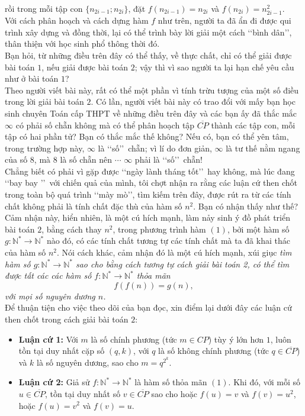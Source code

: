 rồi trong mỗi tập con $\{n_{2i-1};n_{2i}\}$, đặt $f(n_{2i-1})=n_{2i}$ và $f(n_{2i})=n_{2i-1}^2$.\\
Với cách phân hoạch và cách dựng hàm $f$ như trên, người ta đã ẩn đi được qui trình xây dựng và đồng thời, lại có thể trình bày lời giải một cách \lq\lq bình dân\rq\rq, thân thiện với học sinh phổ thông thời đó.\\
Bạn hỏi, từ những điều trên đây có thể thấy, về thực chất, chỉ có thể giải được bài toán $1$, nếu giải được bài toán $2$; vậy thì vì sao người ta lại hạn chế yêu cầu như ở bài toán $1$?\\
Theo người viết bài này, rất có thể một phần vì tính trừu tượng của một số điều trong lời giải bài toán $2$. Có lần, người viết bài này có trao đổi với mấy bạn học sinh chuyên Toán cấp THPT về những điều trên đây và các bạn ấy đã thắc mắc $\infty$ có phải số chẵn không mà có thể phân hoạch tập $\overline{CP}$ thành các tập con, mỗi tập có hai phần tử? Bạn có thắc mắc thế không? Nếu có, bạn có thể yên tâm, trong trường hợp này, $\infty$ là \lq\lq số\rq\rq\, chẵn; vì lí do đơn giản, $\infty$ là tư thế nằm ngang của số $8$, mà $8$ là số chẵn nên $\cdots$ $\infty$ phải là \lq\lq số\rq\rq\, chẵn!\\
Chẳng biết có phải vì gặp được \lq\lq ngày lành tháng tốt\rq\rq\,  hay không, mà lúc đang \lq\lq bay bay \rq\rq\, với chiến quả của mình, tôi chợt nhận ra rằng các luận cứ then chốt trong toàn bộ quá trình \lq\lq mày mò\rq\rq, tìm kiếm trên đây, được rút ra từ các tính chất không phải là tính chất đặc thù của hàm số $n^2$. Bạn có nhận thấy như thế? Cảm nhận này, hiển nhiên, là một cú hích mạnh, làm nảy sinh ý đồ phát triển bài toán $2$, bằng cách thay $n^2$, trong phương trình hàm $(1)$, bởi một hàm số $g:\mathbb{N}^*\rightarrow\mathbb{N}^*$ nào đó, có các tính chất tương tự các tính chất mà ta đã khai thác của hàm số $n^2$. Nói cách khác, cảm nhận đó là một cú hích mạnh, xúi giục \textit{tìm hàm số $g:\mathbb{N}^*\rightarrow\mathbb{N}^*$ sao cho bằng cách tương tự cách giải bài toán 2, có thể tìm được tất các các hàm số $f:\mathbb{N}^*\rightarrow\mathbb{N}^*$ thỏa mãn} \[f(f(n))=g(n),\tag{3}\]
\textit{với mọi số nguyên dương $n$.}\\
Để thuận tiện cho việc theo dõi của bạn đọc, xin điểm lại dưới đây các luận cứ then chốt trong cách giải bài toán $2$:
\begin{itemize}
	\item \textbf{Luận cứ 1:} Với $m$ là số chính phương (tức $m\in CP$) tùy ý lớn hơn $1$, luôn tồn tại duy nhất cặp số $(q,k)$, với $q$ là số không chính phương (tức $q\in\overline{CP}$) và $k$ là số nguyên dương, sao cho $m=q^{2^k}$.
	\item \textbf{Luận cứ 2:} Giả sử $f:\mathbb{N}^*\rightarrow\mathbb{N}^*$ là hàm số thỏa mãn $(1)$. Khi đó, với mỗi số $u\in\overline{CP}$, tồn tại duy nhất số $v\in\overline{CP}$ sao cho hoặc $f(u)=v$ và $f(v)=u^2$, hoặc $f(u)=v^2$ và $f(v)=u$.    
\end{itemize}
